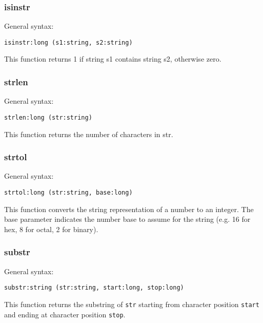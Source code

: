 \documentclass[twoside,english]{article}
\newenvironment{vindent}
{\begin{list}{}{\setlength{\listparindent}{6pt}}
\item[]}
{\end{list}}
\begin{document}
\subsubsection{isinstr}
General syntax:

\begin{vindent}
\begin{verbatim}
isinstr:long (s1:string, s2:string)
\end{verbatim}
\end{vindent}
This function returns 1 if string s1 contains string s2, otherwise zero.


\subsubsection{strlen}
General syntax:

\begin{vindent}
\begin{verbatim}
strlen:long (str:string)
\end{verbatim}
\end{vindent}
This function returns the number of characters in str.


\subsubsection{strtol}

General syntax:

\begin{vindent}
\begin{verbatim}
strtol:long (str:string, base:long)
\end{verbatim}
\end{vindent}
This function converts the string representation of a number to an integer.
The base parameter indicates the number base to assume for the string (e.g.
16 for hex, 8 for octal, 2 for binary).


\subsubsection{substr}
General syntax:

\begin{vindent}
\begin{verbatim}
substr:string (str:string, start:long, stop:long)
\end{verbatim}
\end{vindent}
This function returns the substring of \texttt{str} starting from character
position \texttt{start} and ending at character position \texttt{stop}.
\end{document}
